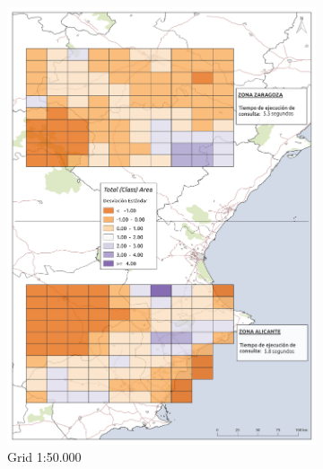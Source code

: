 \begin{figure}
\begin{subfigure}[b]{0.4\textwidth}
    \includegraphics[width=\textwidth]{ResultadosyDiscusion/Figs/Results/c_50.pdf}
    \caption{Grid 1:50.000}
    \label{fig:c_50}
  \end{subfigure}             
  \begin{subfigure}[b]{0.4\textwidth}

\end{subfigure}
\end{figure}
